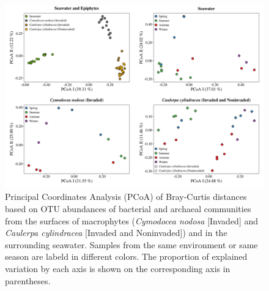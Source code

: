 \documentclass[12pt,]{article}
\begin{document}
\begin{figure}[H]

{\centering \includegraphics[width=1\linewidth]{../results/figures/pcoa_figure} 

}

\caption{Principal Coordinates Analysis (PCoA) of Bray-Curtis distances based on OTU abundances of bacterial and archaeal communities from the surfaces of macrophytes (\textit{Cymodocea nodosa} [Invaded] and \textit{Caulerpa cylindracea} [Invaded and Noninvaded]) and in the surrounding seawater. Samples from the same environment or same season are labeld in different colors. The proportion of explained variation by each axis is shown on the corresponding axis in parentheses.\label{pcoa}}\label{fig:unnamed-chunk-5}
\end{figure}
\end{document}
